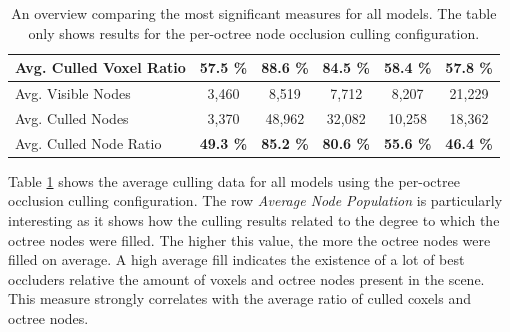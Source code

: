 \begin{table}[!htb]
\begin{tabular}{|lccccc|}
    \multicolumn{1}{|l|}{Avg. Culled Voxel Ratio}   & \multicolumn{1}{c|}{\textbf{57.5 \%}}         & \multicolumn{1}{c|}{\textbf{88.6 \%}}         & \multicolumn{1}{c|}{\textbf{84.5 \%}} & \multicolumn{1}{c|}{\textbf{58.4 \%}}     & \multicolumn{1}{c|}{\textbf{57.8 \%}}     \\ \hline
    \multicolumn{1}{|l|}{Avg. Visible Nodes}        & \multicolumn{1}{c|}{3,460}                    & \multicolumn{1}{c|}{8,519}                    & \multicolumn{1}{c|}{7,712}            & \multicolumn{1}{c|}{8,207}                & \multicolumn{1}{c|}{21,229}               \\
    \multicolumn{1}{|l|}{Avg. Culled Nodes}         & \multicolumn{1}{c|}{3,370}                    & \multicolumn{1}{c|}{48,962}                   & \multicolumn{1}{c|}{32,082}           & \multicolumn{1}{c|}{10,258}               & \multicolumn{1}{c|}{18,362}               \\
    \multicolumn{1}{|l|}{Avg. Culled Node Ratio}    & \multicolumn{1}{c|}{\textbf{49.3 \%}}         & \multicolumn{1}{c|}{\textbf{85.2 \%}}         & \multicolumn{1}{c|}{\textbf{80.6 \%}} & \multicolumn{1}{c|}{\textbf{55.6 \%}}     & \multicolumn{1}{c|}{\textbf{46.4 \%}}     \\ \hline
    
  \end{tabular}
  \caption{An overview comparing the most significant measures for all models. 
  The table only shows results for the per-octree node occlusion culling configuration.}
  \label{tbl:culling-result-overview-pooc}
\end{table}
  
\noindent
Table \ref{tbl:culling-result-overview-pooc} shows the average culling data for all models using the per-octree 
occlusion culling configuration. The row \emph{Average Node Population} is particularly interesting as it shows 
how the culling results related to the degree to which the octree nodes were filled. The higher this value, the 
more the octree nodes were filled on average. A high average fill indicates the existence of a lot of best occluders 
relative the amount of voxels and octree nodes present in the scene. This measure strongly correlates with the 
average ratio of culled coxels and octree nodes. \\


